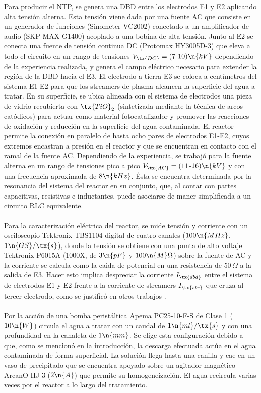 Para producir el NTP, se genera una DBD entre los electrodos E1 y E2 aplicando alta tensión alterna. Esta tensión viene dada por una fuente AC que consiste en un generador de funciones (Sinometer VC2002) conectado a un amplificador de audio (SKP MAX G1400) acoplado a una bobina de alta tensión. Junto al E2 se conecta una fuente de tensión continua DC (Protomax HY3005D-3) que eleva a todo el circuito en un rango de tensiones $V_{\tx{DC}} = (7$-$10) \n{kV}$ dependiendo de la experiencia realizada, y genera el campo eléctrico necesario para extender la región de la DBD hacia el E3. El electrodo a tierra E3 se coloca a centímetros del sistema E1-E2 para que los streamers de plasma alcancen la superficie del agua a tratar. En su superficie, se ubica alineada con el sistema de electrodos una pieza de vidrio recubierta con $\tx{TiO}_2$ (sintetizada mediante la técnica de arcos catódicos) para actuar como material fotocatalizador y promover las reacciones de oxidación y reducción en la superficie del agua contaminada. El reactor permite la conexión en paralelo de hasta ocho pares de electrodos E1-E2, cuyos extremos encastran a presión en el reactor y que se encuentran en contacto con el ramal de la fuente AC. Dependiendo de la experiencia, se trabajó para la fuente alterna en un rango de tensiones pico a pico $V_{\tx{AC}} = (11$-$16) \n{kV}$ y con una frecuencia aproximada de $8 \n{kHz}$.  Ésta se encuentra determinada por la resonancia del sistema del reactor en su conjunto, que, al contar con partes capacitivas, resistivas e inductantes, puede asociarse de maner simplificada a un circuito RLC equivalente. \\\\
Para la caracterización eléctrica del reactor, se mide tensión y corriente con un osciloscopio Tektronix TBS1104 digital de cuatro canales ($100 \n{MHz}$, $1 \n{GS}/\tx{s}$), donde la tensión se obtiene con una punta de alto voltaje Tektronix P6015A (1000X, de $3 \n{pF}$ y $100 \n{M}\Omega$) sobre la fuente de AC y la corriente se calcula como la caida de potencial en una resistencia de $50\,\Omega$ a la salida de E3. Hacer esto implica despreciar la corriente $I_{\tx{dbd}}$ entre el sistema de electrodos E1 y E2 frente a la corriente de streamers $I_{\tx{str}}$ que cruza al tercer electrodo, como se justificó en otros trabajos . \\\\
Por la acción de una bomba peristáltica Apema PC25-10-F-S de Clase 1 ($10 \n{W}$) circula el agua a tratar con un caudal de $1 \n{ml}/\tx{s}$ y con una profundidad en la canaleta de $1 \n{mm}$. Se elige esta configuración debido a que, como se mencionó en la introducción, la descarga efectuada actúa en el agua contaminada de forma superficial. La solución llega hasta una canilla y cae en un vaso de precipitado que se encuentra apoyado sobre un agitador magnético ArcanO HJ-3 ($2 \n{A}$) que permite su homogeneización. El agua recircula varias veces por el reactor a lo largo del tratamiento.
